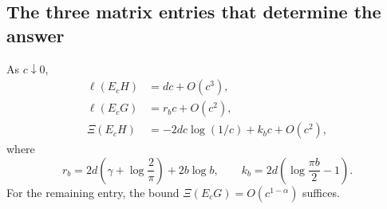 \documentclass[11pt,a4paper]{article}
\numberwithin{equation}{section}
\theoremstyle{definition}
\theoremstyle{remark}
\begin{document}
\subsection{The three matrix entries that determine the answer}
\begin{proposition}
\label{prop:entries}
As $c\downarrow0$,
\begin{align}
 \ell(E_cH)&=dc+O(c^3),\label{eq:entry12}\\
 \ell(E_cG)&=r_bc+O(c^2),\label{eq:entry11}\\
 \Xi(E_cH)&=-2dc\log(1/c)+k_bc+O(c^2),\label{eq:entry22}
\end{align}
where
\begin{equation}
 r_b=2d\left(\gamma+\log\frac2\pi\right)+2b\log b,
 \qquad k_b=2d\left(\log\frac{\pi b}{2}-1\right).
 \label{eq:rk}
\end{equation}
For the remaining entry, the bound
$\Xi(E_cG)=O(c^{1-\alpha})$ suffices.
\end{proposition}
\end{document}
